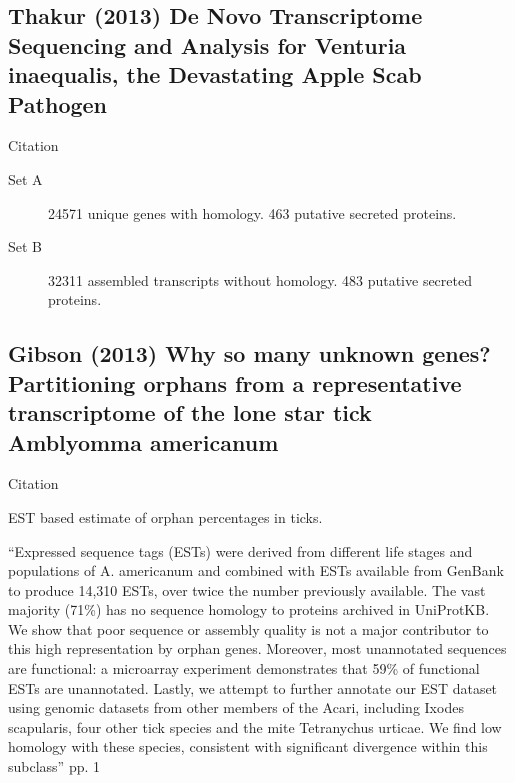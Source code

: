 


\subsection{Thakur (2013) De Novo Transcriptome Sequencing and Analysis for
Venturia inaequalis, the Devastating Apple Scab Pathogen}

    Citation \cite{thakur_novo_2013}

    \begin{description}
        \item[Set A] 24571 unique genes with homology. 463 putative secreted
            proteins.
        \item[Set B] 32311 assembled transcripts without homology. 483 putative
            secreted proteins.
    \end{description}


\subsection{Gibson (2013) Why so many unknown genes? Partitioning orphans
from a representative transcriptome of the lone star tick Amblyomma
americanum}

    Citation \cite{gibson_why_2013}

    EST based estimate of orphan percentages in ticks.

    ``Expressed sequence tags (ESTs) were derived from different life stages
    and populations of A. americanum and combined with ESTs available from
    GenBank to produce 14,310 ESTs, over twice the number previously available.
    The vast majority (71\%) has no sequence homology to proteins archived in
    UniProtKB. We show that poor sequence or assembly quality is not a major
    contributor to this high representation by orphan genes. Moreover, most
    unannotated sequences are functional: a microarray experiment demonstrates
    that 59\% of functional ESTs are unannotated. Lastly, we attempt to further
    annotate our EST dataset using genomic datasets from other members of the
    Acari, including Ixodes scapularis, four other tick species and the mite
    Tetranychus urticae. We find low homology with these species, consistent
    with significant divergence within this subclass'' pp. 1

